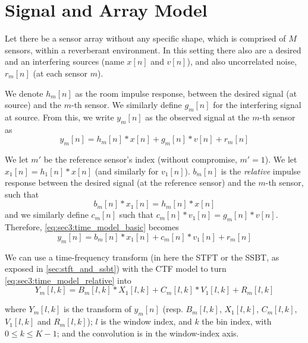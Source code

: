 \section{Signal and Array Model}
\label{sec:signal_model}

Let there be a sensor array without any specific shape, which is comprised of $M$ sensors, within a reverberant environment. In this setting there also are a desired and an interfering sources (name $x[n]$ and $v[n]$), and also uncorrelated noise, $r_m[n]$ (at each sensor $m$).

We denote $h_m[n]$ as the room impulse response, between the desired signal (at source) and the $m$-th sensor. We similarly define $g_m[n]$ for the interfering signal at source. From this, we write $y_m[n]$ as the observed signal at the $m$-th sensor as
\begin{equation}
	\label{eq:sec3:time_model_basic}
	y_m[n] = h_m[n] \ast x[n] + g_m[n] \ast v[n] + r_m[n]
\end{equation}

We let $m'$ be the reference sensor's index (without compromise, $m' = 1$). We let $x_1[n] = h_1[n] \ast x[n]$ (and similarly for $v_1[n]$). $b_m[n]$ is the \textit{relative} impulse response between the desired signal (at the reference sensor) and the $m$-th sensor, such that
\begin{equation}
	b_m[n] \ast x_1[n] = h_m[n] \ast x[n]
\end{equation}
and we similarly define $c_m[n]$ such that $c_m[n] \ast v_1[n] = g_m[n] \ast v[n]$. Therefore, \cref{eq:sec3:time_model_basic} becomes
\begin{equation}
	\label{eq:sec3:time_model_relative}
	y_m[n] = b_m[n] \ast x_1[n] + c_m[n] \ast v_1[n] + r_m[n]
\end{equation}

We can use a time-frequency transform (in here the STFT or the SSBT, as exposed in \cref{sec:stft_and_ssbt}) with the CTF model \cite{talmon_relative_2009} to turn \cref{eq:sec3:time_model_relative} into
\begin{equation}
	\label{eq:sec3:time-freq_model_conv}
	Y_m[l,k] = B_m[l,k] \ast X_1[l,k] + C_m[l,k] \ast V_1[l,k] + R_m[l,k]
\end{equation}

where $Y_m[l,k]$ is the transform of $y_m[n]$ (resp. $B_m[l,k]$, $X_1[l,k]$, $C_m[l,k]$, $V_1[l,k]$ and $R_m[l,k]$); $l$ is the window index, and $k$ the bin index, with $0 \leq k \leq K-1$; and the convolution is in the window-index axis.

